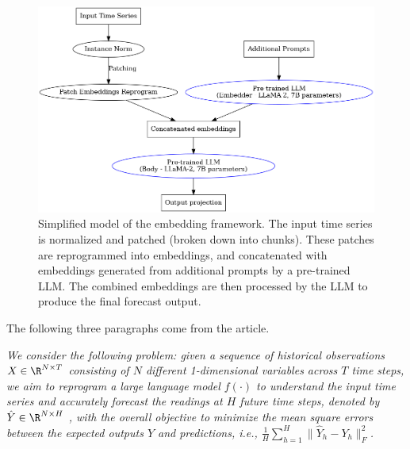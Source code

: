 \begin{figure}[h!]
	\centering
	\includegraphics[width=0.5\linewidth]{"pictures/graph.png"}
	\caption{Simplified model of the embedding framework.
		The input time series is normalized and patched (broken down into chunks). These patches are reprogrammed into embeddings,
		and concatenated with embeddings generated from additional prompts by a pre-trained LLM.
		The combined embeddings are then processed by the LLM to produce the final forecast output. }

	\label{fig:prompt_embedding_fig}
\end{figure}



The following three paragraphs come from the article.\cite{reprogramming_llm}

\textit{We consider the following problem: given a sequence of historical observations \(X \in \R^{N\times T}\)
	consisting of \(N\) different 1-dimensional variables across \(T\) time steps, we aim to reprogram a large
	language model \(f(\cdot)\) to understand the input time series and accurately forecast the readings at \(H\) future time steps, denoted by \(\hat{Y} \in \R^{N\times H}\) , with the overall objective to minimize the mean square errors between the expected outputs \(Y\) and predictions, i.e., \(\frac1H \sum_{h=1}^H \| \hat{Y}_h - Y_h \|_F^2 \).}

